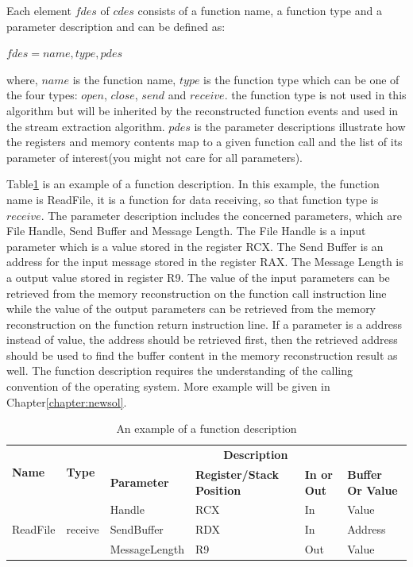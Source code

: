 Each element $fdes$ of $cdes$ consists of a function name, a function type and a parameter description and can be defined as:

$fdes = {name, type, pdes}$

where, $name$ is the function name, $type$ is the function type which can be one of the four types: $open$, $close$, $send$ and $receive$. the function type is not used in this algorithm but will be inherited by the reconstructed function events and used in the stream extraction algorithm. $pdes$ is the parameter descriptions illustrate how the registers and memory contents map to a given function call and the list of its parameter of interest(you might not care for all parameters). 

Table\ref{functionexample} is an example of a function description. In this example, the function name is ReadFile, it is a function for data receiving, so that function type is $receive$. The parameter description includes the concerned parameters, which are File Handle, Send Buffer and Message Length. The File Handle is a input parameter which is a value stored in the register RCX. The Send Buffer is an address for the input message stored in the register RAX. The Message Length is a output value stored in register R9. The value of the input parameters can be retrieved from the memory reconstruction on the function call instruction line while the value of the output parameters can be retrieved from the memory reconstruction on the function return instruction line. If a parameter is a address instead of value, the address should be retrieved first, then the retrieved address should be used to find the buffer content in the memory reconstruction result as well.  The function description requires the understanding of the calling convention of the operating system. More example will be given in Chapter\ref{chapter:newsol}.

\begin{table}[H]
        \centering
        \caption{An example of a function description}
        \label{functionexample}
        \begin{tabular}{|l|l|l|l|l|l|}
            \hline
             \multirow{2}{*}{{\textbf{Name}}} & \multirow{2}{*}{{\textbf{Type}}} & \multicolumn{4}{c|}{\textbf{Description}}  \\
              \cline{3-6} 
             & & \textbf{Parameter}& \textbf{Register/Stack Position}& \textbf{In or Out} &  \textbf{Buffer Or Value}  \\
             \hline
             \multirow{3}{*}{ReadFile}
             &\multirow{3}{*}{receive} &  Handle & RCX & In & Value\\
              \cline{3-6} 
             & & SendBuffer & RDX & In & Address\\
              \cline{3-6} 
             & & MessageLength & R9 & Out & Value\\
            \hline            
        \end{tabular}
    \end{table}

